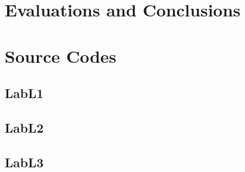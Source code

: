 \documentclass{article}
\begin{document}
\section{Evaluations and Conclusions}



\section{Source Codes}


\subsection{LabL1}



\subsection{LabL2}



\subsection{LabL3}



\end{document}
